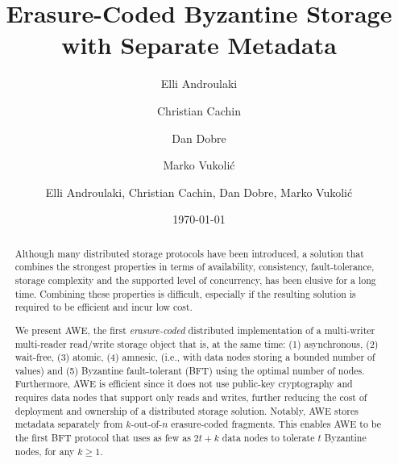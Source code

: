 \documentclass[oribibl]{llncs}
\theoremstyle{definition-boldhead}
\newcommand{\NAME}{AWE\xspace}
\newcommand{\nodes}{nodes\xspace}
\begin{document}
\title{\bf Erasure-Coded Byzantine Storage with Separate Metadata}


\if\submit\no

\author{Elli Androulaki\footnotemark[1]
  \and Christian Cachin\footnotemark[1]
  \and Dan Dobre\footnotemark[2]
  \and Marko Vukoli\'c\footnotemark[3]
  }

\date{\today}

\renewcommand{\thefootnote}{\fnsymbol{footnote}}
\renewcommand{\thefootnote}{\arabic{footnote}}


\else


\author{Elli Androulaki,
  Christian Cachin,
  Dan Dobre,
  Marko Vukoli\'c}


\fi


\maketitle

\pagestyle{plain}
\thispagestyle{plain}

\begin{abstract}\noindent
  Although many distributed storage protocols have been introduced, a
  solution that combines the strongest properties in terms of
  availability, consistency, fault-tolerance, storage complexity and
  the supported level of concurrency, has been elusive for a long
  time. Combining these properties is difficult, especially if the
  resulting solution is required to be efficient and incur low cost.

  We present \NAME, the first \emph{erasure-coded} distributed
  implementation of a multi-writer multi-reader read/write storage
  object that is, at the same time: (1) asynchronous, (2) wait-free,
  (3) atomic, (4) amnesic, (i.e., with data \nodes storing a bounded
  number of values) and (5) Byzantine fault-tolerant (BFT) using the
  optimal number of \nodes. Furthermore, \NAME is efficient since it
  does not use public-key cryptography and requires data \nodes that
  support only reads and writes, further reducing the cost of
  deployment and ownership of a distributed storage solution. Notably,
  \NAME stores metadata separately from $k$-out-of-$n$ erasure-coded
  fragments. This enables \NAME to be the first BFT protocol that uses
  as few as $2t+k$ data \nodes to tolerate $t$ Byzantine \nodes, for
  any $k\ge 1$.
\end{abstract}
\end{document}
